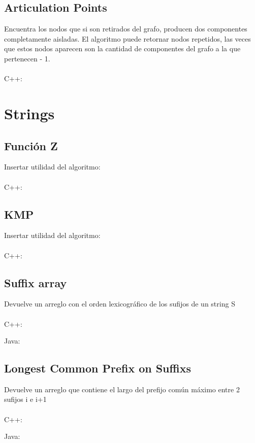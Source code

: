 \documentclass{article}
\begin{document}
    \subsection{Articulation Points}
        Encuentra los nodos que si son retirados del grafo, producen dos componentes \\
        completamente aisladas. El algoritmo puede retornar nodos repetidos, las veces que
        estos nodos aparecen son la cantidad de componentes del grafo a la que pertenecen - 1.
        \\ \\
        C++:
        

\pagebreak
\section{Strings}
    \subsection{Función Z}
        Insertar utilidad del algoritmo:
        \\ \\
        C++:
        
    \subsection{KMP}
        Insertar utilidad del algoritmo:
        \\ \\
        C++:
        
    \subsection{Suffix array}
        Devuelve un arreglo con el orden lexicográfico de los sufijos de un string S
        \\ \\
        C++:
        
        Java:
        
    \subsection{Longest Common Prefix on Suffixs}
        Devuelve un arreglo que contiene el largo del prefijo común máximo entre 2 sufijos i e i+1
        \\ \\
        C++:
        
        Java:
        
\end{document}
